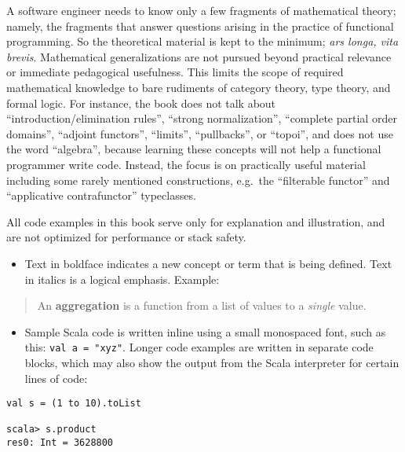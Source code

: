 A software engineer needs to know only a few fragments of mathematical
theory; namely, the fragments that answer questions arising in the
practice of functional programming. So the theoretical material is
kept to the minimum; \emph{ars longa, vita brevis}. Mathematical generalizations
are not pursued beyond practical relevance or immediate pedagogical
usefulness. This limits the scope of required mathematical knowledge
to bare rudiments of category theory, type theory, and formal logic.
For instance, the book does not talk about ``introduction/elimination
rules'', ``strong normalization'', ``complete partial order domains'',
``adjoint functors'', ``limits'', ``pullbacks'', or ``topoi'',
and does not use the word ``algebra'', because learning these concepts
will not help a functional programmer write code. Instead, the focus
is on practically useful material \textendash{} including some rarely
mentioned constructions, e.g.~the ``filterable functor'' and ``applicative
contrafunctor'' typeclasses.

All code examples in this book serve only for explanation and illustration,
and are not optimized for performance or stack safety.

\begin{itemize}
\item Text in boldface indicates a new concept or term that is being defined.
Text in italics is a logical emphasis. Example:
\end{itemize}
\begin{quotation}
An \textbf{aggregation} is a function from a list
of values to a \emph{single} value.
\end{quotation}
\begin{itemize}
\item Sample Scala code is written inline using a small monospaced font,
such as this: \lstinline!val a = "xyz"!. Longer code examples are
written in separate code blocks, which may also show the output from
the Scala interpreter for certain lines of code:
\end{itemize}
\begin{lstlisting}
val s = (1 to 10).toList

scala> s.product
res0: Int = 3628800 
\end{lstlisting}


